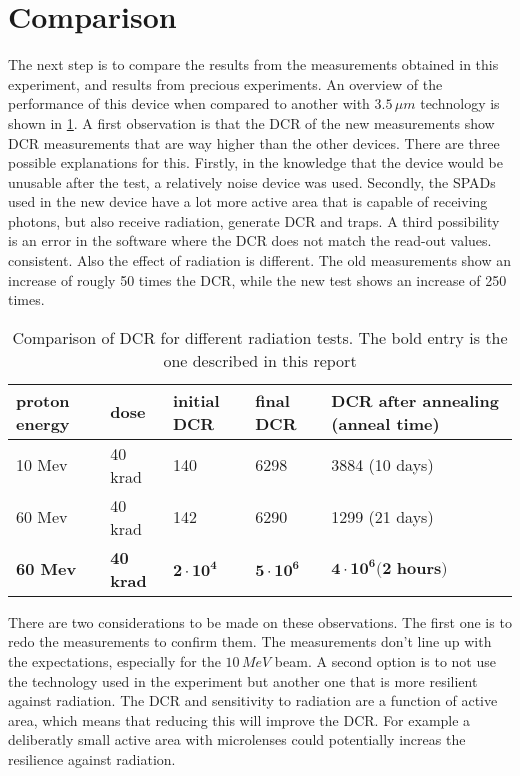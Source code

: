 \clearpage
\section{Comparison}\label{ssec:results}

The next step is to compare the results from the measurements obtained in this experiment, and results from precious experiments. An overview of the performance of this device when compared to another with $3.5\,\mu m$ technology is shown in \cref{tab:comparison}. A first observation is that the DCR of the new measurements show DCR measurements that are way higher than the other devices. There are three possible explanations for this. Firstly, in the knowledge that the device would be unusable after the test, a relatively noise device was used. Secondly, the SPADs used in the new device have a lot more active area that is capable of receiving photons, but also receive radiation, generate DCR and traps. A third possibility is an error in the software where the DCR does not match the read-out values. consistent. Also the effect of radiation is different. The old measurements show an increase of rougly 50 times the DCR, while the new test shows an increase of 250 times.

\begin{table}[h]
		\centering
\caption{Comparison of DCR for different radiation tests. The bold entry is the one described in this report}
\label{tab:comparison}
\begin{tabular}{|ll|lll|} \hline
\textbf{proton energy} & dose             & initial DCR       & final DCR         & DCR after annealing (anneal time) \\ \hline
10 Mev                 & 40 krad          & 140               & 6298              & 3884 (10 days)                    \\
60 Mev                 & 40 krad          & 142               & 6290              & 1299 (21 days)                    \\
\textbf{60 Mev}        & \textbf{40 krad} & $\mathbf{2\cdot10^4}$ & $\mathbf{5\cdot10^6}$ & $\mathbf{4\cdot10^6 \textbf{(2 hours)}}$      \\  \hline
\end{tabular}
\end{table}

There are two considerations to be made on these observations. The first one is to redo the measurements to confirm them. The measurements don't line up with the expectations, especially for the $10\,MeV$ beam. A second option is to not use the technology used in the experiment but another one that is more resilient against radiation. The DCR and sensitivity to radiation are a function of active area, which means that reducing this will improve the DCR. For example a deliberatly small active area with microlenses could potentially increas the resilience against radiation.
